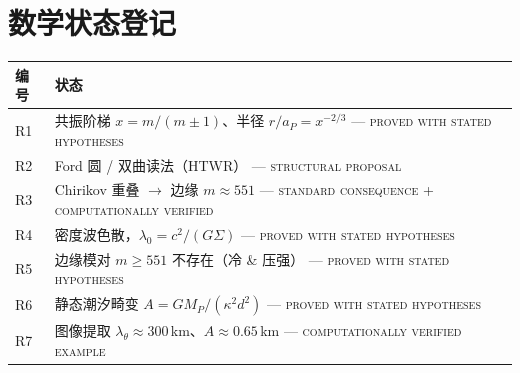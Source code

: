 \documentclass[11pt]{ctexart}
\theoremstyle{remark}
\begin{document}
\appendix
\section{数学状态登记}\label{app:status}
\begin{center}
\begin{tabular}{l p{}}
\toprule
编号 & 状态\\
\midrule
R1 & 共振阶梯 $x=m/(m\pm1)$、半径 $r/a_P=x^{-2/3}$ ---
\textsc{proved with stated hypotheses}\\
R2 & Ford 圆 / 双曲读法（HTWR） --- \textsc{structural proposal}\\
R3 & Chirikov 重叠 $\to$ 边缘 $m\approx551$ ---
\textsc{standard consequence} + \textsc{computationally verified}\\
R4 & 密度波色散，$\lambda_0=c^2/(G\Sigma)$ ---
\textsc{proved with stated hypotheses}\\
R5 & 边缘模对 $m\ge551$ 不存在（冷 \& 压强） ---
\textsc{proved with stated hypotheses}\\
R6 & 静态潮汐畸变 $A=GM_P/(\kappa^2d^2)$ ---
\textsc{proved with stated hypotheses}\\
R7 & 图像提取 $\lambda_\theta\approx300$\,km、$A\approx0.65$\,km ---
\textsc{computationally verified example}\\
\bottomrule
\end{tabular}
\end{center}

\nocite{Cuzzi1985WavyEdges,GoldreichTremaine1979,PapaloizouLin1988}


\end{document}
